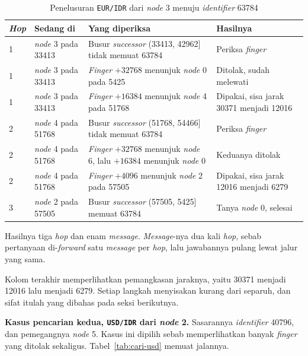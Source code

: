 \begin{table}[htbp]
  \centering
  \caption{Penelusuran \texttt{EUR/IDR} dari \textit{node} 3 menuju \textit{identifier} 63784}
  \label{tab:cari-eur}
  \begin{tabularx}{\textwidth}{|l|l|X|l|}
    \hline
    \textbf{\textit{Hop}} & \textbf{Sedang di} & \textbf{Yang diperiksa} & \textbf{Hasilnya} \\
    \hline
    1 & \textit{node} 3 pada 33413 & Busur \textit{successor} (33413, 42962] tidak memuat 63784 & Periksa \textit{finger} \\
    \hline
    1 & \textit{node} 3 pada 33413 & \textit{Finger} $+32768$ menunjuk \textit{node} 0 pada 5425 & Ditolak, sudah melewati \\
    \hline
    1 & \textit{node} 3 pada 33413 & \textit{Finger} $+16384$ menunjuk \textit{node} 4 pada 51768 & Dipakai, sisa jarak 30371 menjadi 12016 \\
    \hline
    2 & \textit{node} 4 pada 51768 & Busur \textit{successor} (51768, 54466] tidak memuat 63784 & Periksa \textit{finger} \\
    \hline
    2 & \textit{node} 4 pada 51768 & \textit{Finger} $+32768$ menunjuk \textit{node} 6, lalu $+16384$ menunjuk \textit{node} 0 & Keduanya ditolak \\
    \hline
    2 & \textit{node} 4 pada 51768 & \textit{Finger} $+4096$ menunjuk \textit{node} 2 pada 57505 & Dipakai, sisa jarak 12016 menjadi 6279 \\
    \hline
    3 & \textit{node} 2 pada 57505 & Busur \textit{successor} (57505, 5425] memuat 63784 & Tanya \textit{node} 0, selesai \\
    \hline
  \end{tabularx}
\end{table}

Hasilnya tiga \textit{hop} dan enam \textit{message}. \textit{Message}-nya dua kali \textit{hop}, sebab
pertanyaan di-\textit{forward} satu \textit{message} per \textit{hop}, lalu jawabannya pulang
lewat jalur yang sama.

Kolom terakhir memperlihatkan pemangkasan jaraknya, yaitu 30371 menjadi 12016
lalu menjadi 6279. Setiap langkah menyisakan kurang dari separuh, dan sifat
itulah yang dibahas pada seksi berikutnya.

\textbf{Kasus pencarian kedua, \texttt{USD/IDR} dari \textit{node} 2.}
Sasarannya \textit{identifier} 40796, dan pemegangnya \textit{node} 5. Kasus ini dipilih sebab
memperlihatkan banyak \textit{finger} yang ditolak sekaligus.
Tabel~\ref{tab:cari-usd} memuat jalannya.


